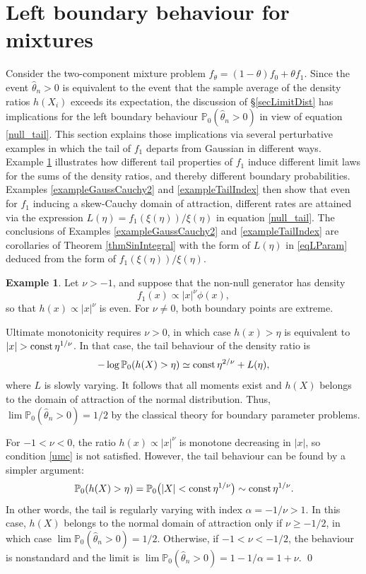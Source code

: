 \documentclass[11pt]{article}
\theoremstyle{definition}
\newtheorem{example}{Example}[section]
\newcommand{\PP}{\mathbb{P}}
\def\Prob{{\mathbb P}}
\begin{document}
\section{Left boundary behaviour for mixtures}\label{secTwoTails}

Consider the two-component mixture problem $f_\theta = (1-\theta)f_0 + \theta f_1$. Since the event $\hat\theta_n >0$ is equivalent to the event that the sample average of the density ratios $h(X_i)$ exceeds its expectation, the discussion of \S \ref{secLimitDist} has implications for the left boundary behaviour $\PP_0(\hat\theta_n >0)$ in view of equation \eqref{null_tail}. This section explains those implications via several perturbative examples in which the tail of $f_1$ departs from Gaussian in different ways. Example \ref{exampleNearlyNormal} illustrates how different tail properties of $f_1$ induce different limit laws for the sums of the density ratios, and thereby different boundary probabilities. Examples \ref{exampleGaussCauchy2} and \ref{exampleTailIndex} then show that even for $f_1$ inducing a skew-Cauchy domain of attraction, different rates are attained via the expression $L(\eta)=f_1(\xi(\eta))/\xi(\eta)$ in equation \eqref{null_tail}.
The conclusions of Examples \ref{exampleGaussCauchy2} and \ref{exampleTailIndex} are corollaries of Theorem \ref{thmSinIntegral} with the form of $L(\eta)$ in \eqref{eqLParam} deduced from the form of $f_1(\xi(\eta))/\xi(\eta)$.


\begin{example}\label{exampleNearlyNormal}
	Let $\nu > -1$, and suppose that the non-null generator has density
	\[
	f_1(x) \propto |x|^\nu \phi(x),
	\]
	so that $h(x) \propto |x|^{\nu}$ is even.
	For $\nu \neq 0$, both boundary points are extreme.
	
	Ultimate monotonicity requires $\nu > 0$, in which case $h(x) > \eta$ is equivalent to
	$|x| > \hbox{\rm const}\, \eta^{1/\nu}$.
	In that case, the tail behaviour of the density ratio is
	\[
	-\log \Prob_0 (h(X) > \eta) \simeq \hbox{\rm const}\, \eta^{2/\nu} + L(\eta),
	\]
	where $L$ is slowly varying. It follows that all moments exist and $h(X)$ belongs to the domain of attraction of the normal distribution.
	Thus, $\lim \Prob_0(\hat\theta_n > 0) = 1/2$ by the classical theory for boundary parameter problems.
	
	For $-1 < \nu < 0$, the ratio $h(x)\propto |x|^{\nu}$ is monotone decreasing in $|x|$, so condition \eqref{umc} is not satisfied.  However, the tail behaviour can be found by a simpler argument:
	\[
	\Prob_0(h(X) > \eta) = \Prob_0\bigl(|X| < \hbox{\rm const}\, \eta^{1/\nu}\bigr) \sim \hbox{\rm const}\, \eta^{1/\nu}.
	\]
	In other words, the tail is regularly varying with index $\alpha=-1/\nu > 1$.
	In this case, $h(X)$ belongs to the normal domain of attraction only if $\nu \ge -1/2$, in which case $\lim \Prob_0(\hat\theta_n > 0) = 1/2$.  Otherwise, if $-1 < \nu < -1/2$, the behaviour is nonstandard and the limit is $\lim\Prob_0(\hat\theta_n > 0)=1-1/\alpha = 1+\nu$.  \qed
\end{example}
\end{document}
